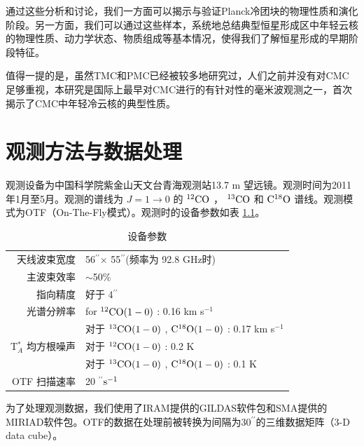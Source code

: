 \documentclass[UTF8, nocolorlinks]{pkuthss}
\newcommand{\coa}{$\rm ^{12}CO$ }
\newcommand{\cob}{$\rm ^{13}CO$ }
\newcommand{\coc}{$\rm C^{18}O$ }
\newcommand{\coaa}{$\rm^{12}CO(1-0)$ }
\newcommand{\cobb}{$\rm^{13}CO(1-0)$ }
\newcommand{\cocc}{$\rm C^{18}O(1-0)$ }
\newcommand{\kms}{km s$^{-1}$}
\newcommand{\arcsec}{$^{\prime\prime}$}
\begin{document}
		通过这些分析和讨论，我们一方面可以揭示与验证Planck冷团块的物理性质和演化阶段。另一方面，我们可以通过这些样本，系统地总结典型恒星形成区中年轻云核的物理性质、动力学状态、物质组成等基本情况，使得我们了解恒星形成的早期阶段特征。

		值得一提的是，虽然TMC和PMC已经被较多地研究过，人们之前并没有对CMC足够重视，本研究是国际上最早对CMC进行的有针对性的毫米波观测之一，首次揭示了CMC中年轻冷云核的典型性质。

\chapter{观测方法与数据处理}
		
		观测设备为中国科学院紫金山天文台青海观测站13.7 m 望远镜。观测时间为2011年1月至5月。观测的谱线为 $J=1 \rightarrow 0 $ 的  \coa， \cob 和 \coc 谱线。观测模式为OTF（On-The-Fly模式）。观测时的设备参数如表 \ref{Fig.Observation}。

		\begin{table}[H]
        \centering
        \caption{设备参数\label{Fig.Observation}}
        \setlength{\tabcolsep}{0.1in}
        \vspace{0.5em}
        \begin{tabular}{rl}
        \toprule
        \hline
        天线波束宽度 & 56\arcsec$\times$ 55\arcsec (频率为 92.8 GHz时) \\
        主波束效率 & $\sim$50\%                               \\
        指向精度   & 好于 4\arcsec                     \\
        光谱分辨率  & for \coaa: 0.16 \kms                     \\
                             & 对于 \cobb, \cocc:  0.17 \kms           \\
        T$^*_A$ 均方根噪声    & 对于 \coaa: 0.2 K                         \\
                             & 对于 \cobb, \cocc: 0.1 K               \\
        OTF 扫描速率          & 20 \arcsec $\rm s^{-1}$\\
        \hline
        \bottomrule
        \end{tabular}
        \end{table}


        为了处理观测数据，我们使用了IRAM提供的GILDAS软件包\supercite{2000ASPC..217..299G}和SMA提供的MIRIAD软件包\supercite{1995ASPC...77..433S}。OTF的数据在处理前被转换为间隔为30\arcsec 的三维数据矩阵（3-D data cube）。
\end{document}
